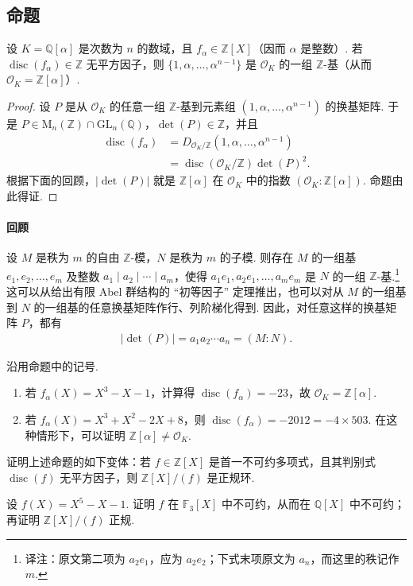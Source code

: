 \subsection{命题}\label{sec:nt-2-5-2}
\begin{proposition*}
设 $K=\mathbb Q[\alpha]$ 是次数为 $n$ 的数域，且 $f_\alpha\in\mathbb Z[X]$（因而 $\alpha$ 是整数）.
若 $\operatorname{disc}(f_\alpha)\in\mathbb Z$ 无平方因子，则 $\{1,\alpha,\ldots,\alpha^{n-1}\}$ 是 $\mathcal O_K$ 的一组 $\mathbb Z$-基（从而 $\mathcal O_K=\mathbb Z[\alpha]$）.
\end{proposition*}
\begin{proof}
设 $P$ 是从 $\mathcal O_K$ 的任意一组 $\mathbb Z$-基到元素组 $(1,\alpha,\ldots,\alpha^{n-1})$ 的换基矩阵.
于是 $P\in\mathrm M_n(\mathbb Z)\cap\mathrm{GL}_n(\mathbb Q)$，$\det(P)\in\mathbb Z$，并且
\begin{align*}
\operatorname{disc}(f_\alpha)
&=D_{\mathcal O_K/\mathbb Z}(1,\alpha,\ldots,\alpha^{n-1})\\
&=\operatorname{disc}(\mathcal O_K/\mathbb Z)\det(P)^2.
\end{align*}
根据下面的回顾，$|\det(P)|$ 就是 $\mathbb Z[\alpha]$ 在 $\mathcal O_K$ 中的指数 $(\mathcal O_K:\mathbb Z[\alpha])$. 命题由此得证.
\end{proof}
\paragraph{回顾}
设 $M$ 是秩为 $m$ 的自由 $\mathbb Z$-模，$N$ 是秩为 $m$ 的子模.
则存在 $M$ 的一组基 $e_1,e_2,\ldots,e_m$ 及整数 $a_1\mid a_2\mid\cdots\mid a_m$，使得 $a_1e_1,a_2e_1,\ldots,a_me_m$ 是 $N$ 的一组 $\mathbb Z$-基.\footnote{译注：原文第二项为 $a_2e_1$，应为 $a_2e_2$；下式末项原文为 $a_n$，而这里的秩记作 $m$.}
这可以从给出有限 Abel 群结构的 ``初等因子'' 定理推出，也可以对从 $M$ 的一组基到 $N$ 的一组基的任意换基矩阵作行、列阶梯化得到.
因此，对任意这样的换基矩阵 $P$，都有
\begin{align*}
|\det(P)|=a_1a_2\cdots a_n=(M:N).
\end{align*}
\begin{example*}
沿用命题中的记号.
\begin{enumerate}[label=\roman*)]
\item 若 $f_\alpha(X)=X^3-X-1$，计算得 $\operatorname{disc}(f_\alpha)=-23$，故 $\mathcal O_K=\mathbb Z[\alpha]$.
\item 若 $f_\alpha(X)=X^3+X^2-2X+8$，则 $\operatorname{disc}(f_\alpha)=-2012=-4\times503$.
在这种情形下，可以证明 $\mathbb Z[\alpha]\ne\mathcal O_K$.
\end{enumerate}
\end{example*}
\begin{exercise*}
证明上述命题的如下变体：若 $f\in\mathbb Z[X]$ 是首一不可约多项式，且其判别式 $\operatorname{disc}(f)$ 无平方因子，则 $\mathbb Z[X]/(f)$ 是正规环.
\end{exercise*}
\begin{example*}
设 $f(X)=X^5-X-1$. 证明 $f$ 在 $\mathbb F_3[X]$ 中不可约，从而在 $\mathbb Q[X]$ 中不可约；再证明 $\mathbb Z[X]/(f)$ 正规.
\end{example*}

